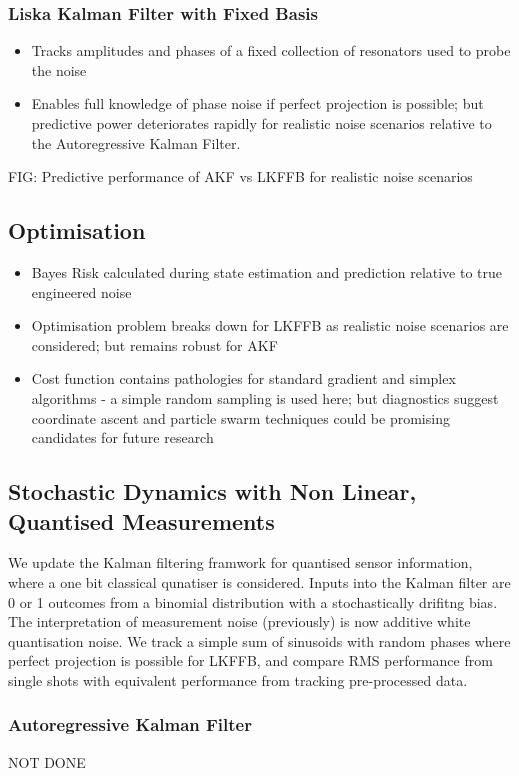\subsubsection{Liska Kalman Filter with Fixed Basis}
\begin{itemize}
\item Tracks amplitudes and phases of a fixed collection of resonators used to probe the noise 
\item Enables full knowledge of phase noise if perfect projection is possible; but predictive power deteriorates rapidly for realistic noise scenarios relative to the Autoregressive Kalman Filter.
\end{itemize} 
FIG: Predictive performance of AKF vs LKFFB for realistic noise scenarios

\subsection{Optimisation}
\begin{itemize}
\item Bayes Risk calculated during state estimation and prediction relative to true engineered noise
\item Optimisation problem breaks down for LKFFB as realistic noise scenarios are considered; but remains robust for AKF
\item Cost function contains pathologies for standard gradient and simplex algorithms - a simple random sampling is used here; but diagnostics suggest coordinate ascent and particle swarm techniques could be promising candidates for future research
\end{itemize}
\subsection{Stochastic Dynamics with Non Linear, Quantised Measurements}

We update the Kalman filtering framwork for quantised sensor information, where a one bit classical qunatiser is considered. Inputs into the Kalman filter are 0 or 1  outcomes from a binomial distribution with a stochastically drifitng bias. The interpretation of measurement noise (previously) is now additive white quantisation noise. We track a simple sum of sinusoids with random phases where perfect projection is possible for LKFFB, and compare RMS performance from single shots with equivalent performance from tracking pre-processed data.

\subsubsection{Autoregressive Kalman Filter}
NOT DONE 
